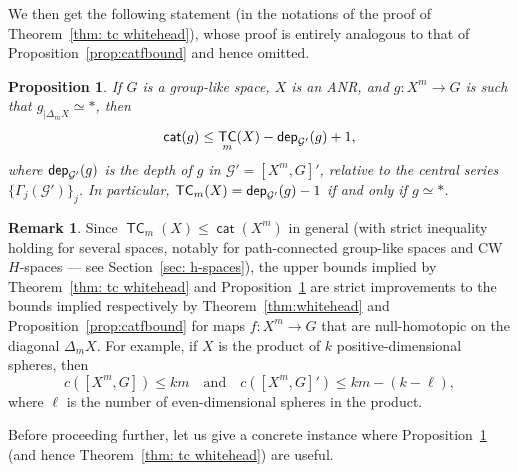 \documentclass[amscd,amssymb,verbatim,10pt]{amsart}
\numberwithin{equation}{section}
\theoremstyle{plain}
\newtheorem{proposition}[theorem]{Proposition}
\theoremstyle{definition}
\newtheorem{remark}[theorem]{Remark}
\DeclareMathOperator{\cat}{{\mathsf{cat}}}
\DeclareMathOperator{\TC}{{\mathsf{TC}}}
\newcommand{\cG}{{\mathcal{G}}}
\newcommand{\dep}{{\sf {dep}}}
\begin{document}
We then get the following statement (in the notations of the proof of Theorem~\ref{thm: tc whitehead}), whose proof is entirely analogous to that of Proposition~\ref{prop:catfbound} and hence omitted.

\begin{proposition}\label{prop:catfbound-usingtcm}
If $G$ is a group-like space, $X$ is an ANR, and $g\colon X^m\to G$ is such that $g_{|\Delta_m X}\simeq\ast$, then 
$$\cat(g) \leq \TC_m(X) - \dep_{\cG'}(g) +1,$$
where $\dep_{\cG'}(g)$ is the depth of $g$ in $\cG'=[X^m,G]'$, relative to the central series $\{\Gamma_j(\cG')\}_j$. In particular, $\TC_m(X)=\dep_{\cG'}(g)-1$ if and only if $g \simeq *$.
\end{proposition}

\begin{remark}
Since $\TC_m(X)\le\cat(X^m)$ in general (with strict inequality holding for several spaces, notably for path-connected group-like spaces and CW $H$-spaces --- see Section~\ref{sec: h-spaces}), the upper bounds implied by Theorem~\ref{thm: tc whitehead} and Proposition~\ref{prop:catfbound-usingtcm} are strict improvements to the bounds implied respectively by Theorem~\ref{thm:whitehead} and Proposition~\ref{prop:catfbound} for maps $f\colon X^m\to G$ that are null-homotopic on the diagonal $\Delta_mX$. For example, if $X$ is the product of $k$ positive-dimensional spheres, then 
    \[
    c([X^m,G])\le km\quad\text{and}\quad c([X^m,G]')\le km-(k-\ell),
    \]
    where $\ell$ is the number of even-dimensional spheres in the product.
\end{remark}


Before proceeding further, let us give a concrete instance where Proposition~\ref{prop:catfbound-usingtcm} (and hence Theorem~\ref{thm: tc whitehead}) are useful.
\end{document}
